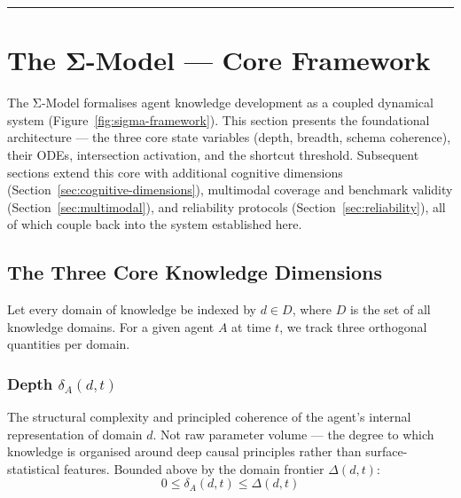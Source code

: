 \noindent\rule{\linewidth}{0.4pt}


\section{The Σ-Model --- Core Framework}\label{sec:core-framework}

The Σ-Model formalises agent knowledge development as a coupled
dynamical system (Figure~\ref{fig:sigma-framework}). This section presents the foundational architecture
--- the three core state variables (depth, breadth, schema coherence),
their ODEs, intersection activation, and the shortcut threshold.
Subsequent sections extend this core with additional cognitive
dimensions (Section~\ref{sec:cognitive-dimensions}), multimodal coverage
and benchmark validity (Section~\ref{sec:multimodal}), and reliability
protocols (Section~\ref{sec:reliability}), all of which couple back into
the system established here.

\subsection{The Three Core Knowledge Dimensions}\label{sec:three-core}

Let every domain of knowledge be indexed by $d \in D$, where $D$ is the
set of all knowledge domains. For a given agent $A$ at time $t$,
we track three orthogonal quantities per domain.

\subsubsection{Depth \texorpdfstring{$\delta_A(d,t)$}{delta\_A(d,t)}}\label{sec:depth}

The structural complexity and principled coherence of the agent's
internal representation of domain $d$. Not raw parameter volume ---
the degree to which knowledge is organised around deep causal principles
rather than surface-statistical features. Bounded above by the domain
frontier $\Delta(d,t)$:
\begin{equation}\label{eq:depth-bounds}
0 \leq \delta_A(d,t) \leq \Delta(d,t)
\end{equation}

